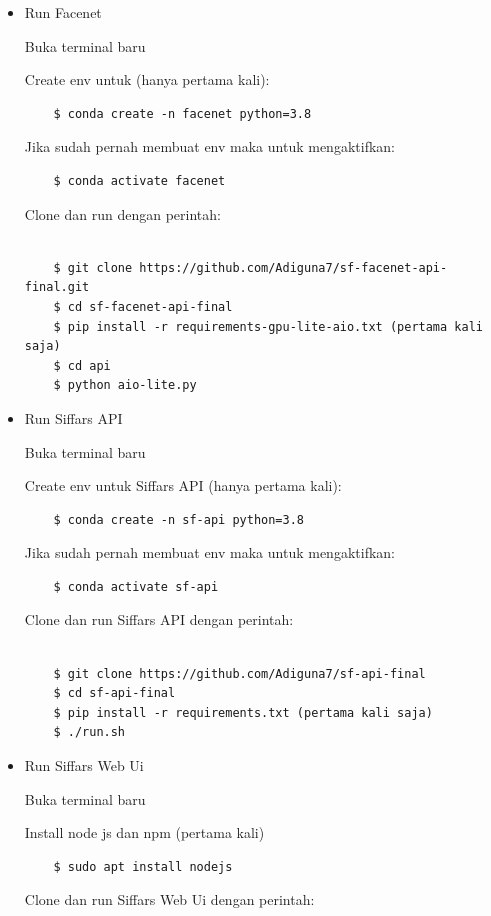 \begin{itemize}
  \item Run Facenet
  
  Buka terminal baru 

  Create env untuk  (hanya pertama kali):
  \begin{lstlisting}
    $ conda create -n facenet python=3.8
  \end{lstlisting}
  Jika sudah pernah membuat env maka untuk mengaktifkan:
  \begin{lstlisting}
    $ conda activate facenet
  \end{lstlisting}
  Clone dan run  dengan perintah:
  \begin{lstlisting}

    $ git clone https://github.com/Adiguna7/sf-facenet-api-final.git        
    $ cd sf-facenet-api-final
    $ pip install -r requirements-gpu-lite-aio.txt (pertama kali saja)
    $ cd api
    $ python aio-lite.py
  \end{lstlisting}

  \item Run Siffars API
  
  Buka terminal baru 
  
  Create env untuk Siffars API (hanya pertama kali):
  \begin{lstlisting}
    $ conda create -n sf-api python=3.8
  \end{lstlisting}
  Jika sudah pernah membuat env maka untuk mengaktifkan:
  \begin{lstlisting}
    $ conda activate sf-api
  \end{lstlisting}
  Clone dan run Siffars API dengan perintah:
  \begin{lstlisting}

    $ git clone https://github.com/Adiguna7/sf-api-final
    $ cd sf-api-final
    $ pip install -r requirements.txt (pertama kali saja)
    $ ./run.sh
  \end{lstlisting}

  \item Run Siffars Web Ui
  
  Buka terminal baru

  Install node js dan npm (pertama kali)
  \begin{lstlisting}
    $ sudo apt install nodejs
  \end{lstlisting}

  Clone dan run Siffars Web Ui dengan perintah:
  \begin{lstlisting}


\end{lstlisting}
\end{itemize}
